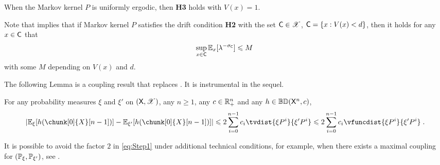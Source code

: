 \documentclass[leqno,11pt,a4paper]{article}
\begin{document}
\par
When the Markov kernel $P$ is uniformly ergodic, then {\bf H3} holds with $V(x) = 1$.   
\par
Note that \cite[Proposition 14.3.1]{douc:moulines:priouret:soulier:2018} implies that if Markov kernel $P$ satisfies the drift condition {\bf H2} with the set $\mathsf{C} \in \mathscr{X}$, $\mathsf{C} = \{x: V(x) < d\}$, then it holds for any $x \in \mathsf{C}$ that
\begin{equation}
\label{eq:exp_moment_hit}
\sup_{x\in \mathsf{C}}\mathbb{E}_x[\lambda^{-\sigma_{\mathsf{C}}}]\leqslant M\;
\end{equation}
with some $M$ depending on $V(x)$ and $d$.
\par
The following Lemma is a coupling result that replaces \cite[Lemma~6]{MR3407208}. It is instrumental in the sequel.
\begin{lemma}\label{lem:DMPS18}
 For any probability measures $\xi$ and $\xi'$ on $(\mathsf{X},\mathscr{X})$, any $n\geqslant 1$, any $c\in \mathbb{R}_+^n$ and any $h\in \mathbb{B}\mathbb{D}(\mathsf{X}^n,c)$,
\begin{equation*}\label{eq:Step1}
 |\Ebb_\xi[h(\chunk[0]{X}[n-1])]-\Ebb_{\xi'}[h(\chunk[0]{X}[n-1])]|\leqslant 2\sum_{i=0}^{n-1}c_i \tvdist{\xi P^i}{\xi'P^i} \leqslant 2\sum_{i=0}^{n-1}c_i \vfuncdist{\xi P^i}{\xi'P^i} \eqsp.
\end{equation*}
\end{lemma}
\begin{remark}
 It is possible to avoid the factor $2$ in \eqref{eq:Step1} under additional technical conditions, for example, when there exists a maximal coupling for $(\mathbb{P}_\xi,\mathbb{P}_{\xi'})$, see \cite[Lemma 23.2.1]{douc:moulines:priouret:soulier:2018}.
\end{remark}
\end{document}
